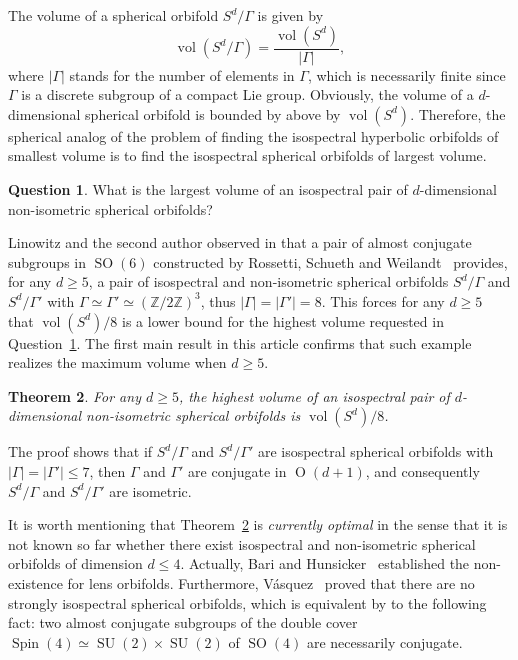 \documentclass[12pt,a4paper,final]{amsart}
\theoremstyle{plain}
\newtheorem{theorem}{Theorem}[section]
\theoremstyle{definition}
\newtheorem{question}[theorem]{Question}
\theoremstyle{remark}
\numberwithin{equation}{section}
\newcommand{\Z}{\mathbb Z}
\DeclareMathOperator{\Ot}{O}
\DeclareMathOperator{\SO}{SO}
\DeclareMathOperator{\SU}{SU}
\DeclareMathOperator{\Spin}{Spin}
\DeclareMathOperator{\vol}{vol}
\begin{document}
The volume of a spherical orbifold $S^d/\Gamma$ is given by 
\begin{equation}\label{eq:vol}
\vol(S^d/\Gamma)=\frac{\vol(S^d)}{|\Gamma|},
\end{equation}
where $|\Gamma|$ stands for the number of elements in $\Gamma$, which is necessarily finite since $\Gamma$ is a discrete subgroup of a compact Lie group. 
Obviously, the volume of a $d$-dimensional spherical orbifold is bounded by above by $\vol(S^d)$. 
Therefore, the spherical analog of the problem of finding the isospectral hyperbolic orbifolds of smallest volume is to find the isospectral spherical orbifolds of largest volume.

\begin{question}\label{question:highestvolume-orbifold}
What is the largest volume of an isospectral pair of $d$-dimensional non-isometric spherical orbifolds?
\end{question}

Linowitz and the second author observed in \cite[Thm.~1.5]{LauretLinowitz} that a pair of almost conjugate subgroups in $\SO(6)$ constructed by Rossetti, Schueth and Weilandt~\cite{RossettiSchuethWeilandt08} provides, for any $d\geq5$, a pair of isospectral and non-isometric spherical orbifolds $S^d/\Gamma$ and $S^d/\Gamma'$   with $\Gamma\simeq\Gamma'\simeq (\Z/2\Z)^3$, thus $|\Gamma|=|\Gamma'|=8$.
This forces for any $d\geq5$ that $\vol(S^d)/8$ is a lower bound for the highest volume requested in Question~\ref{question:highestvolume-orbifold}.  
The first main result in this article confirms that such example realizes the maximum volume when $d\geq 5$. 

\begin{theorem}\label{thm-main:orbifolds}
For any $d\geq5$, the highest volume of an isospectral pair of $d$-dimensional non-isometric spherical orbifolds is $\vol(S^d)/8$. 
\end{theorem}

The proof shows that if $S^d/\Gamma$ and $S^d/\Gamma'$ are isospectral spherical orbifolds with $|\Gamma|=|\Gamma'|\leq 7$, then $\Gamma$ and $\Gamma'$ are conjugate in $\Ot(d+1)$, and consequently $S^d/\Gamma$ and $S^d/\Gamma'$ are isometric. 


It is worth mentioning that Theorem~\ref{thm-main:orbifolds} is \emph{currently optimal} in the sense that it is not known so far whether there exist isospectral and non-isometric spherical orbifolds of dimension $d\leq 4$. 
Actually, Bari and Hunsicker~\cite{ShamsHunsicker17} established the non-existence for lens orbifolds. 
Furthermore, V\'{a}squez~\cite[Prop.~2.4]{Vasquez18} proved that there are no strongly isospectral spherical orbifolds, which is equivalent by \cite{Pesce95} to the following fact: 
two almost conjugate subgroups of the double cover $\Spin(4)\simeq \SU(2)\times\SU(2)$ of $\SO(4)$ are necessarily conjugate. 
\end{document}
